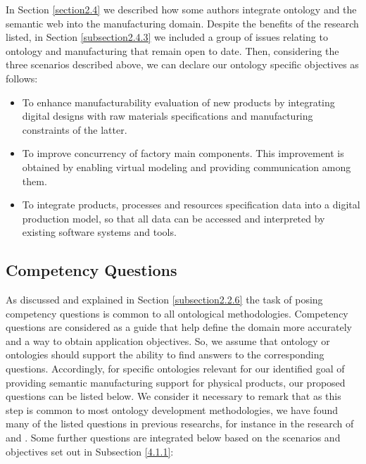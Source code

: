 \begin{itemize}
	
	
\end{itemize}


In Section \ref{section2.4} we described how some authors integrate ontology and the semantic web into the manufacturing domain. Despite the benefits of the research listed, in Section \ref{subsection2.4.3} we included a group of issues relating to ontology and manufacturing that remain open to date. Then, considering the three scenarios described above, we can declare our ontology specific objectives as follows:


\begin{itemize}
	
	\item To enhance manufacturability evaluation of new products by integrating digital designs with raw materials specifications and manufacturing constraints of the latter.
	
	\item To improve concurrency of factory main components. This improvement is obtained by enabling virtual modeling and providing communication among them. 
	
	\item  To integrate products, processes and resources specification data into a digital production model, so that all data can be accessed and interpreted by existing software systems and tools.
	
\end{itemize}

\subsection{Competency Questions}\label{4.1.2}

As discussed and explained in Section \ref{subsection2.2.6} the task of posing competency questions is common to all ontological methodologies.  Competency questions are considered as a guide that help define the domain more accurately and a way to obtain application objectives. So, we assume that ontology or ontologies should support the ability to find answers to the corresponding questions. Accordingly, for specific ontologies relevant for our identified goal of providing semantic manufacturing support for physical products, our proposed questions can be listed below. We consider it necessary to remark that as this step is common to most ontology development methodologies, we have found many of the listed questions in previous researchs, for instance in the research of \cite{hepp_references_2013} and  \cite{radhakrishnan_design_1996}. Some further questions are integrated below based on the scenarios and objectives set out in Subsection \ref{4.1.1}:

